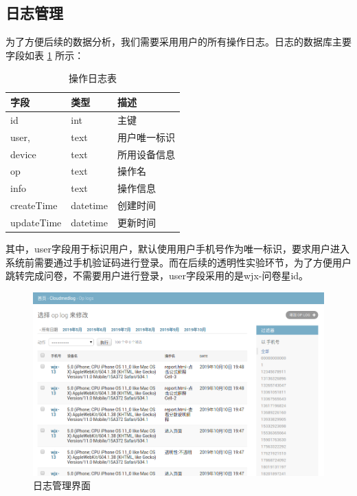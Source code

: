 \subsection{日志管理}
为了方便后续的数据分析，我们需要采用用户的所有操作日志。日志的数据库主要字段如表 \ref{tab:op_log} 所示：

\begin{table}[]
    \centering
    \begin{tabular}{lll}
        \toprule
        字段 & 类型 & 描述 \\ 
        \midrule
        id & int & 主键 \\
        user, & text & 用户唯一标识 \\ 
        device & text & 所用设备信息 \\
        op & text & 操作名 \\
        info & text & 操作信息 \\
        createTime & datetime & 创建时间 \\
        updateTime & datetime & 更新时间\\
        \bottomrule
    \end{tabular}
    \caption{操作日志表}
    \label{tab:op_log}
\end{table}


其中，user字段用于标识用户，默认使用用户手机号作为唯一标识，要求用户进入系统前需要通过手机验证码进行登录。而在后续的透明性实验环节，为了方便用户跳转完成问卷，不需要用户进行登录，user字段采用的是wjx-问卷星id。

\begin{figure}[ht]
    \centering
    \includegraphics[width=15cm]{images/op_log.png}
    \caption{日志管理界面}
    \label{fig:op_log}
\end{figure}

